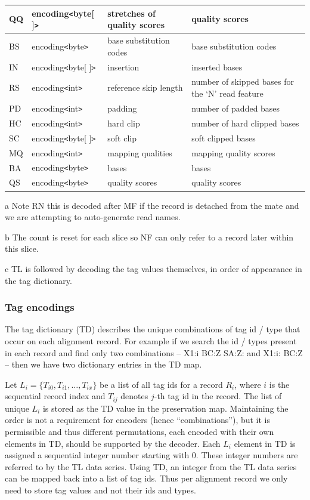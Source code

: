 \documentclass[a4paper]{article}
\begin{document}
\begin{threeparttable}[t]
\begin{tabular}{|l|l|>{\raggedright}p{100pt}|>{\raggedright}p{220pt}|}
QQ & encoding\texttt{<}byte[ ]\texttt{>} & stretches of quality scores & quality scores\tabularnewline
\hline
BS & encoding\texttt{<}byte\texttt{>} & base substitution codes & base substitution
codes\tabularnewline
\hline
IN & encoding\texttt{<}byte[ ]\texttt{>} & insertion & inserted bases\tabularnewline
\hline
RS & encoding\texttt{<}int\texttt{>} & reference skip length & number of skipped 
bases for the `N' read feature\tabularnewline
\hline
PD & encoding\texttt{<}int\texttt{>} & padding & number of padded bases\tabularnewline
\hline
HC & encoding\texttt{<}int\texttt{>} & hard clip & number of hard clipped bases\tabularnewline
\hline
SC & encoding\texttt{<}byte[ ]\texttt{>} & soft clip & soft clipped bases\tabularnewline
\hline
MQ & encoding\texttt{<}int\texttt{>} & mapping qualities & mapping quality scores\tabularnewline
\hline
BA & encoding\texttt{<}byte\texttt{>} & bases & bases\tabularnewline
\hline
QS & encoding\texttt{<}byte\texttt{>} & quality scores & quality scores\tabularnewline
\hline
\end{tabular}

\begin{tablenotes}
\item{a} Note RN this is decoded after MF if the record is detached from the mate and we are attempting to auto-generate read names.
\item{b} The count is reset for each slice so NF can only refer to a record later within this slice.
\item{c} TL is followed by decoding the tag values themselves, in order of appearance in the tag dictionary.
\end{tablenotes}
\end{threeparttable}

\subsubsection*{Tag encodings}
\label{subsubsec:tags}

The tag dictionary (TD) describes the unique combinations of tag id / type that occur on each alignment record.
For example if we search the id / types present in each record and find only two combinations -- X1:i BC:Z SA:Z: and X1:i: BC:Z -- then we have two dictionary entries in the TD map.

Let $L_{i}=\{T_{i0}, T_{i1}, \ldots, T_{ix}\}$ be a list of all tag ids for a record $R_{i}$, where $i$ is the sequential record index and $T_{ij}$ denotes $j$-th tag id in the record.
The list of unique $L_{i}$ is stored as the TD value in the preservation map.
Maintaining the order is not a requirement for encoders (hence ``combinations''), but it is permissible and thus different permutations, each encoded with their own elements in TD, should be supported by the decoder.
Each $L_{i}$ element in TD is assigned a sequential integer number starting with 0.
These integer numbers are referred to by the TL data series.
Using TD, an integer from the TL data series can be mapped back into a list of tag ids.
Thus per alignment record we only need to store tag values and not their ids and types.
\end{document}
